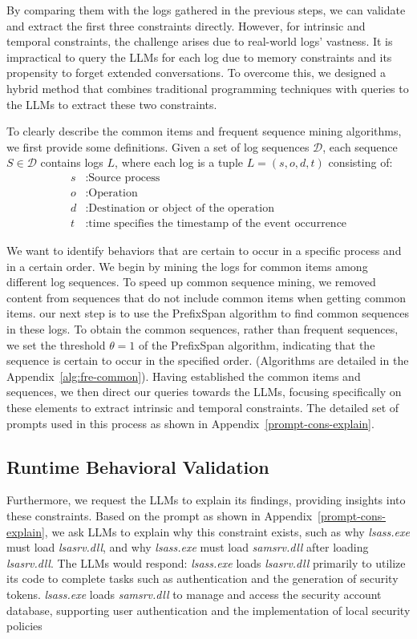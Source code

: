 By comparing them with the logs gathered in the previous steps, we can validate and extract the first three constraints directly.
However, for intrinsic and temporal constraints, the challenge arises due to real-world logs' vastness. It is impractical to query the LLMs for each log due to memory constraints and its propensity to forget extended conversations. To overcome this, we designed a hybrid method that combines traditional programming techniques with queries to the LLMs to extract these two constraints.

To clearly describe the common items and frequent sequence mining algorithms, we first provide some definitions.
Given a set of log sequences \( \mathcal{D} \), each sequence \( S \in \mathcal{D} \) contains logs \( L \), where each log is a tuple \( L = (s, o, d,t) \) consisting of:
\begin{align*}
    s & : \text{Source process} \\
    o & : \text{Operation} \\
    d & : \text{Destination or object of the operation}\\
    t & : \text{time specifies the timestamp of the event occurrence}
\end{align*}

We want to identify behaviors that are certain to occur in a specific process and in a certain order. 
We begin by mining the logs for common items among different log sequences.   
To speed up common sequence mining, we removed content from sequences that do not include common items when getting common items.
our next step is to use the PrefixSpan algorithm to find common sequences in these logs. 
To obtain the common sequences, rather than frequent sequences, we set the threshold \( \theta =1\) of the PrefixSpan algorithm, indicating that the sequence is certain to occur in the specified order.
(Algorithms are detailed in the Appendix~\ref{alg:fre-common}).
Having established the common items and sequences, we then direct our queries towards the LLMs, focusing specifically on these elements to extract intrinsic and temporal constraints. 
The detailed set of prompts used in this process as shown in Appendix~\ref{prompt-cons-explain}.


\subsection{Runtime Behavioral Validation}

Furthermore, we request the LLMs to explain its findings, providing insights into these constraints.
Based on the prompt as shown in Appendix~\ref{prompt-cons-explain}, we ask LLMs to explain why this constraint exists, such as why \textit{lsass.exe} must load \textit{lsasrv.dll}, and why \textit{lsass.exe} must load \textit{samsrv.dll} after loading \textit{lsasrv.dll}. 
The LLMs would respond: \textit{lsass.exe} loads \textit{lsasrv.dll} primarily to utilize its code to complete tasks such as authentication and the generation of security tokens. 
\textit{lsass.exe} loads \textit{samsrv.dll} to manage and access the security account database, supporting user authentication and the implementation of local security policies

